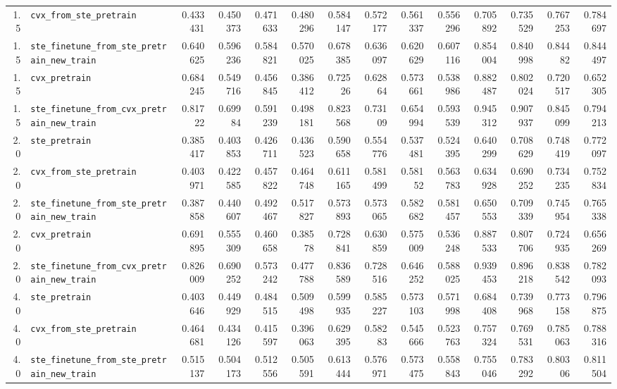 \begin{longtable}{@{}r l *{12}{r}@{}}
1.5 & \texttt{cvx\_from\_ste\_pretrain} & 0.433431 & 0.450373 & 0.471633 & 0.480296 & 0.584147 & 0.572177 & 0.561337 & 0.556296 & 0.705892 & 0.735529 & 0.767253 & 0.784697 \\
1.5 & \texttt{ste\_finetune\_from\_ste\_pretrain\_new\_train} & 0.640625 & 0.596236 & 0.584821 & 0.570025 & 0.678385 & 0.636097 & 0.620629 & 0.607116 & 0.854004 & 0.840998 & 0.84482 & 0.844497 \\
1.5 & \texttt{cvx\_pretrain} & 0.684245 & 0.549716 & 0.456845 & 0.386412 & 0.72526 & 0.62864 & 0.573661 & 0.538986 & 0.882487 & 0.802024 & 0.720517 & 0.652305 \\
1.5 & \texttt{ste\_finetune\_from\_cvx\_pretrain\_new\_train} & 0.81722 & 0.69984 & 0.591239 & 0.498181 & 0.823568 & 0.73109 & 0.654994 & 0.593539 & 0.945312 & 0.907937 & 0.845099 & 0.794213 \\
2.0 & \texttt{ste\_pretrain} & 0.385417 & 0.403853 & 0.426711 & 0.436523 & 0.590658 & 0.554776 & 0.537481 & 0.524395 & 0.640299 & 0.708629 & 0.748419 & 0.772097 \\
2.0 & \texttt{cvx\_from\_ste\_pretrain} & 0.403971 & 0.422585 & 0.457822 & 0.464748 & 0.611165 & 0.581499 & 0.58152 & 0.563783 & 0.634928 & 0.690252 & 0.734235 & 0.752834 \\
2.0 & \texttt{ste\_finetune\_from\_ste\_pretrain\_new\_train} & 0.387858 & 0.440607 & 0.492467 & 0.517827 & 0.573893 & 0.573065 & 0.582682 & 0.581457 & 0.650553 & 0.709339 & 0.745954 & 0.765338 \\
2.0 & \texttt{cvx\_pretrain} & 0.691895 & 0.555309 & 0.460658 & 0.38578 & 0.728841 & 0.630859 & 0.575009 & 0.536248 & 0.887533 & 0.807706 & 0.724935 & 0.656269 \\
2.0 & \texttt{ste\_finetune\_from\_cvx\_pretrain\_new\_train} & 0.826009 & 0.690252 & 0.573242 & 0.477788 & 0.836589 & 0.728516 & 0.646252 & 0.588025 & 0.939453 & 0.896218 & 0.838542 & 0.782093 \\
4.0 & \texttt{ste\_pretrain} & 0.403646 & 0.449929 & 0.484515 & 0.509498 & 0.599935 & 0.585227 & 0.573103 & 0.571998 & 0.684408 & 0.739968 & 0.773158 & 0.796875 \\
4.0 & \texttt{cvx\_from\_ste\_pretrain} & 0.464681 & 0.434126 & 0.415597 & 0.396063 & 0.629395 & 0.58283 & 0.545666 & 0.523763 & 0.757324 & 0.769531 & 0.785063 & 0.788316 \\
4.0 & \texttt{ste\_finetune\_from\_ste\_pretrain\_new\_train} & 0.515137 & 0.504173 & 0.512556 & 0.505591 & 0.613444 & 0.576971 & 0.573475 & 0.558843 & 0.755046 & 0.783292 & 0.80306 & 0.811504 \\

\end{longtable}
